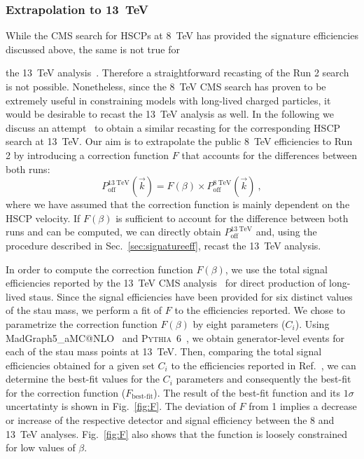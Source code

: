 \subsubsection{Extrapolation to 13~TeV} \label{sec:extra}

While the CMS search for HSCPs at 8~TeV has provided the
signature efficiencies discussed above, the same is not true for

the 13~TeV analysis~\cite{CMS-PAS-EXO-16-036}.
Therefore a straightforward recasting of the Run 2 search is not possible.
Nonetheless, since the 8~TeV CMS search has proven to be extremely useful
in constraining models with long-lived charged particles,
it would be desirable to recast the 13~TeV analysis as well.
In the following we discuss an attempt~\cite{LesHouches2017}
to obtain a similar recasting for the corresponding HSCP search at 13~TeV.
Our aim is to extrapolate the public 8~TeV efficiencies to Run 2 by
introducing a correction function $F$ that accounts for the differences between both runs:
\begin{equation}
\label{eq:introF}
P^{13~\text{TeV}}_{\text{off}}(\vec{k}) = F(\beta) \times
P^{8~\text{TeV}}_{\text{off}}(\vec{k})~,
\end{equation}
where we have assumed that the correction function is mainly dependent on the
HSCP velocity. If $F(\beta)$ is sufficient to account for the difference
between both runs and can be computed, we can directly obtain
$P^{13~\text{TeV}}_{\text{off}}$ and, using the procedure described in
Sec.~\ref{sec:signatureeff}, recast the 13~TeV analysis.

In order to compute the correction function $F(\beta)$, we use
the total signal efficiencies reported by the
13~TeV CMS analysis~\cite{CMS-PAS-EXO-16-036} for
direct production of long-lived staus.
Since the signal efficiencies have been provided for six distinct
values of the stau mass, we perform a fit of $F$ to the efficiencies reported.
We chose to parametrize the correction function $F(\beta)$ by eight parameters
($C_{i}$).
Using {\sc MadGraph5\_aMC@NLO}~\cite{Alwall:2014hca}
and \textsc{Pythia}~6~\cite{Sjostrand:2006za}, we obtain generator-level events
for each of the stau mass points at 13~TeV.
Then, comparing the total signal efficiencies obtained for a given set $C_{i}$
to the efficiencies reported in Ref.~\cite{CMS-PAS-EXO-16-036}, we can determine
the best-fit values for the $C_{i}$ parameters and consequently the
best-fit for the correction function ($F_\text{best-fit}$).
The result of the best-fit function and its $1\sigma$ uncertatinty is shown in
Fig.~\ref{fig:F}. The deviation of $F$ from 1 implies a decrease or increase
of the respective detector and signal efficiency between the 8 and 13~TeV
analyses. Fig.~\ref{fig:F} also shows that the function is loosely constrained
for low values of $\beta$.


